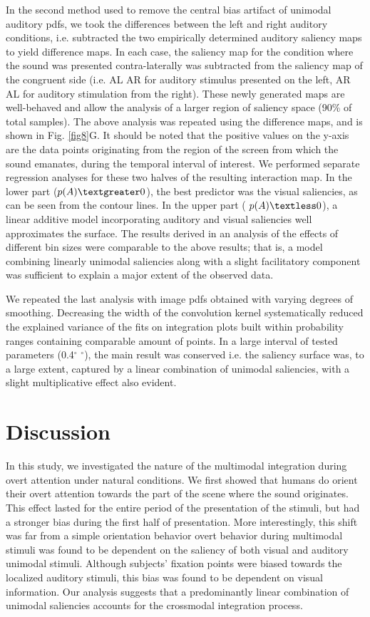 In the second method used to remove the central bias artifact of unimodal
auditory pdfs, we took the differences between the left and right auditory
conditions, i.e. subtracted the two empirically determined auditory
saliency maps to yield difference maps. In each case, the saliency map for
the condition where the sound was presented contra-laterally was subtracted
from the saliency map of the congruent side (i.e. AL \textendash AR for
auditory stimulus presented on the left, AR \textendash AL for auditory
stimulation from the right). These newly generated maps are well-behaved
and allow the analysis of a larger region of saliency space (90\% of total
samples). The above analysis was repeated using the difference maps, and is
shown in Fig. \ref{fig8}G. It should be noted that the positive values on the
y-axis are the data points originating from the region of the screen from
which the sound emanates, during the temporal interval of interest. We
performed separate regression analyses for these two halves of the
resulting interaction map. In the lower part ($p(A) \textgreater 0$), the
best predictor was the visual saliencies, as can be seen from the contour
lines. In the upper part ( $p(A) \textless 0$), a linear additive model
incorporating auditory and visual saliencies well approximates the surface.
The results derived in an analysis of the effects of different bin sizes
were comparable to the above results; that is, a model combining linearly
unimodal saliencies along with a slight facilitatory component was
sufficient to explain a major extent of the observed data. 

We repeated the last analysis with image pdfs obtained with varying degrees
of smoothing. Decreasing the width of the convolution kernel systematically
reduced the explained variance of the fits on integration plots built
within probability ranges containing comparable amount of points. In a
large interval of tested parameters (0.4$^{\circ}$ $^{\circ}$), the main result was conserved i.e. the saliency surface
was, to a large extent, captured by a linear combination of unimodal
saliencies, with a slight multiplicative effect also evident. 

\section{Discussion}

In this study, we investigated the nature of the multimodal integration
during overt attention under natural conditions. We first showed that
humans do orient their overt attention towards the part of the scene where
the sound originates. This effect lasted for the entire period of the
presentation of the stimuli, but had a stronger bias during the first half
of presentation. More interestingly, this shift was far from a simple
orientation behavior \textemdash overt behavior during multimodal stimuli
was found to be dependent on the saliency of both visual and auditory
unimodal stimuli. Although subjects' fixation points were biased towards
the localized auditory stimuli, this bias was found to be dependent on
visual information. Our analysis suggests that a predominantly linear
combination of unimodal saliencies accounts for the crossmodal integration
process. 

